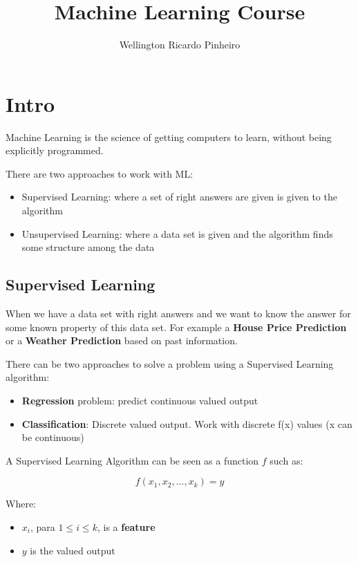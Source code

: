 \documentclass[a4paper]{article}
\title{Machine Learning Course}
\author{Wellington Ricardo Pinheiro}
\begin{document}
\maketitle

\section{Intro}

Machine Learning is the science of getting computers to learn, without being explicitly programmed.

\medskip

There are two approaches to work with ML:

\begin{itemize}
\item Supervised Learning: where a set of right answers are given is given to the algorithm
\item Unsupervised Learning: where a data set is given and the algorithm finds some structure among the data
\end{itemize}

\subsection{Supervised Learning}

When we have a data set with right answers and we want to know the answer for some known property of this data set. For example a \textbf{House Price Prediction} or a \textbf{Weather Prediction} based on past information.

\medskip

There can be two approaches to solve a problem using a Supervised Learning algorithm:

\begin{itemize}
\item \textbf{Regression} problem: predict continuous valued output
\item \textbf{Classification}: Discrete valued output. Work with discrete f(x) values (x can be continuous)
\end{itemize}

A Supervised Learning Algorithm can be seen as a function $f$ such as:

\[f(x_1, x_2, ..., x_k) = y\]

Where:

\begin{itemize}
\item $x_i$, para $1 \le i \le k$, is a \textbf{feature}
\item $y$ is the valued output
\end{itemize}
\end{document}
